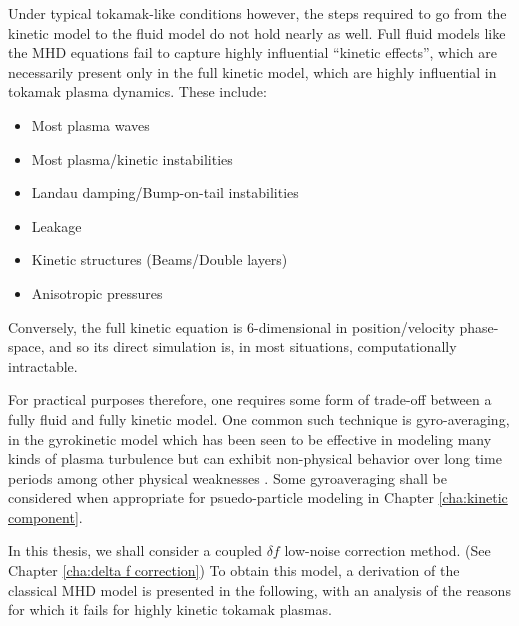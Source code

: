     Under typical tokamak-like conditions however, the steps required to go from the kinetic model to the fluid model do not hold nearly as well. Full fluid models like the MHD equations fail to capture highly influential ``kinetic effects'', which are necessarily present only in the full kinetic model, which are highly influential in tokamak plasma dynamics. These include:
    \begin{itemize}
        \item  Most plasma waves \BA{[Ref]}
        \item  Most plasma/kinetic instabilities \BA{[Ref]}
        \item  Landau damping/Bump-on-tail instabilities \BA{[Ref]}
        \item  Leakage \BA{[Ref]}
        \item  Kinetic structures (Beams/Double layers) \BA{[Ref]}
        \item  Anisotropic pressures \BA{[Ref]}
    \end{itemize}
    Conversely, the full kinetic equation is 6-dimensional in position/velocity phase-space, and so its direct simulation is, in most situations, computationally intractable.

    For practical purposes therefore, one requires some form of trade-off between a fully fluid and fully kinetic model. One common such technique is gyro-averaging, in the gyrokinetic model \cite{Howes_et_al_2006, Parra_Barnes_Peters_2011, Abel_et_al_2013} which has been seen to be effective in modeling many kinds of plasma turbulence \cite{McKee_et_al_2001} but can exhibit non-physical behavior over long time periods \BA{[Ref]} among other physical weaknesses \BA{[Ref]}. Some gyroaveraging shall be considered when appropriate for psuedo-particle modeling in Chapter \ref{cha:kinetic component}. 
    
    In this thesis, we shall consider a coupled $\delta\!f$ low-noise correction method. (See Chapter \ref{cha:delta f correction}) To obtain this model, a derivation of the classical MHD model is presented in the following, with an analysis of the reasons for which it fails for highly kinetic tokamak plasmas.

    
    
    
    

